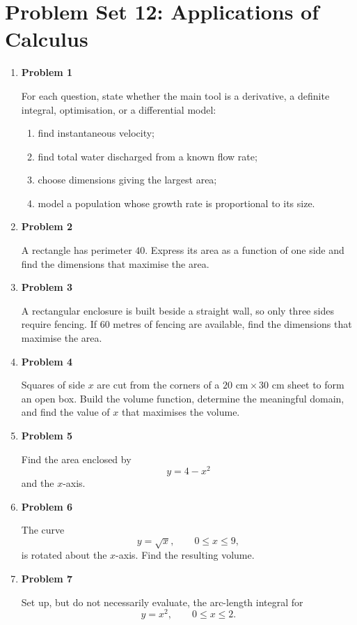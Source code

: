 \section{Problem Set 12: Applications of Calculus}

\begin{enumerate}
\item \textbf{Problem 1}\par
For each question, state whether the main tool is a derivative, a definite integral, optimisation, or a differential model:
\begin{enumerate}
\item find instantaneous velocity;
\item find total water discharged from a known flow rate;
\item choose dimensions giving the largest area;
\item model a population whose growth rate is proportional to its size.
\end{enumerate}

\item \textbf{Problem 2}\par
A rectangle has perimeter \(40\). Express its area as a function of one side and find the dimensions that maximise the area.

\item \textbf{Problem 3}\par
A rectangular enclosure is built beside a straight wall, so only three sides require fencing. If \(60\) metres of fencing are available, find the dimensions that maximise the area.

\item \textbf{Problem 4}\par
Squares of side \(x\) are cut from the corners of a \(20\text{ cm}\times30\text{ cm}\) sheet to form an open box. Build the volume function, determine the meaningful domain, and find the value of \(x\) that maximises the volume.

\item \textbf{Problem 5}\par
Find the area enclosed by
\[
y=4-x^2
\]
and the \(x\)-axis.

\item \textbf{Problem 6}\par
The curve
\[
y=\sqrt{x},\qquad 0\le x\le9,
\]
is rotated about the \(x\)-axis. Find the resulting volume.

\item \textbf{Problem 7}\par
Set up, but do not necessarily evaluate, the arc-length integral for
\[
y=x^2,\qquad 0\le x\le2.
\]


\end{enumerate}
